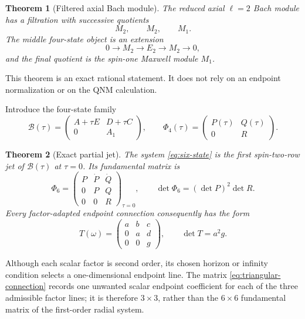 \documentclass[11pt]{article}
\newtheorem{theorem}{Theorem}[section]
\theoremstyle{remark}
\begin{document}
\begin{theorem}[Filtered axial Bach module]\label{thm:filtration}
The reduced axial \(\ell=2\) Bach module has a filtration with successive
quotients
\[
 M_2,\qquad M_2,\qquad M_1.
\]
The middle four-state object is an extension
\[
 0\longrightarrow M_2\longrightarrow E_2
 \longrightarrow M_2\longrightarrow0,
\]
and the final quotient is the spin-one Maxwell module \(M_1\).
\end{theorem}

This theorem is an exact rational statement.  It does not rely on an
endpoint normalization or on the QNM calculation.

Introduce the four-state family
\[
 \mathcal B(\tau)=
 \begin{pmatrix}
 A+\tau E&D+\tau C\\
 0&A_1
 \end{pmatrix},
\qquad
 \Phi_4(\tau)=
 \begin{pmatrix}P(\tau)&Q(\tau)\\0&R\end{pmatrix}.
\]

\begin{theorem}[Exact partial jet]\label{thm:partial-jet}
The system \eqref{eq:six-state} is the first spin-two-row jet of
\(\mathcal B(\tau)\) at \(\tau=0\).  Its fundamental matrix is
\[
 \Phi_6=
 \begin{pmatrix}
 P&\dot P&\dot Q\\
 0&P&Q\\
 0&0&R
 \end{pmatrix}_{\tau=0},
\qquad
 \det\Phi_6=(\det P)^2\det R.
\]
Every factor-adapted endpoint connection consequently has the form
\begin{equation}\label{eq:triangular-connection}
 T(\omega)=
 \begin{pmatrix}
 a&b&c\\
 0&a&d\\
 0&0&g
 \end{pmatrix},
\qquad
 \det T=a^2g.
\end{equation}
\end{theorem}

Although each scalar factor is second order, its chosen horizon or infinity
condition selects a one-dimensional endpoint line.  The matrix
\eqref{eq:triangular-connection} records one unwanted scalar endpoint
coefficient for each of the three admissible factor lines; it is therefore
\(3\times3\), rather than the \(6\times6\) fundamental matrix of the
first-order radial system.
\end{document}
